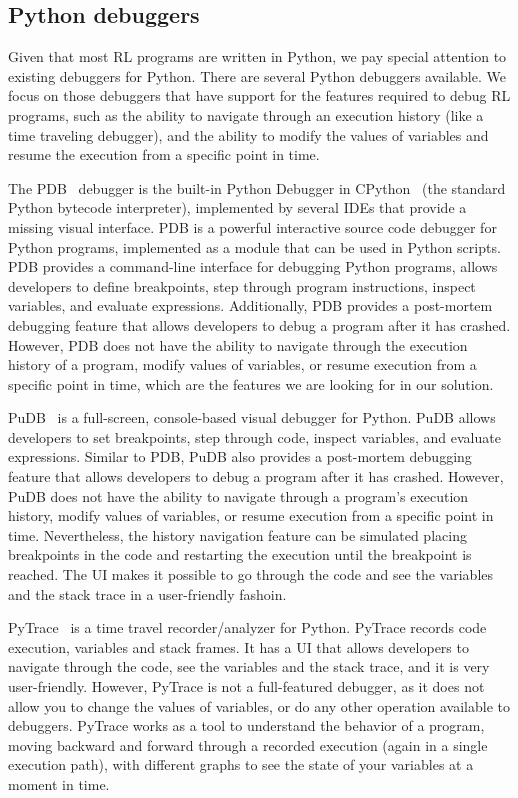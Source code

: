 \subsection{Python debuggers}
\label{sec:py}

Given that  most \ac{RL} programs are written in Python, we pay special attention to existing 
debuggers for Python. There are several Python debuggers available. We focus on those debuggers
that have support for the features required to debug \ac{RL} programs, such as the ability to navigate 
through an execution history (like a time traveling debugger), and the ability to modify the values
of variables and resume the execution from a specific point in time.

The \ac{PDB}~\cite{python-pdb} debugger is the built-in Python Debugger in CPython~\cite{shaw21} 
(the standard Python bytecode interpreter), implemented by several IDEs that provide a missing 
visual interface. \ac{PDB} is a powerful interactive source code debugger for Python programs, 
implemented as a module that can be used in Python scripts. \ac{PDB} provides a command-line 
interface for debugging Python programs, allows developers to define breakpoints, step through 
program instructions, inspect variables, and evaluate expressions. Additionally, \ac{PDB} provides 
a post-mortem debugging feature that allows developers to debug a program after it has crashed. 
However, \ac{PDB} does not have the ability to navigate through the execution history of a program, 
modify values of variables, or resume execution from a specific point in time, which are the features 
we are looking for in our solution. 

PuDB~\cite{pudb} is a full-screen, console-based visual debugger for Python. PuDB allows 
developers to set breakpoints, step through code, inspect variables, and evaluate expressions. 
Similar to \ac{PDB}, PuDB also provides a post-mortem debugging feature that allows developers to 
debug a program after it has crashed. However, PuDB does not have the ability to navigate through 
a program's execution history, modify values of variables, or resume execution from a specific point 
in time. Nevertheless, the history navigation feature can be simulated placing breakpoints in the 
code and restarting the execution until the breakpoint is reached. The UI makes it possible to go 
through the code and see the variables and the stack trace in a user-friendly fashoin.

PyTrace~\cite{pytrace} is a time travel recorder/analyzer for Python. PyTrace records code execution, 
variables and stack frames. It has a UI that allows developers to navigate through the code, 
see the variables and the stack trace, and it is very user-friendly. However, PyTrace is not 
a full-featured debugger, as it does not allow you to change the values of variables, or do 
any other operation available to debuggers. PyTrace works as a tool to understand the behavior of 
a program, moving backward and forward through a recorded execution (again in a single execution 
path),  with different  graphs to see the state of your variables at a moment in time.

